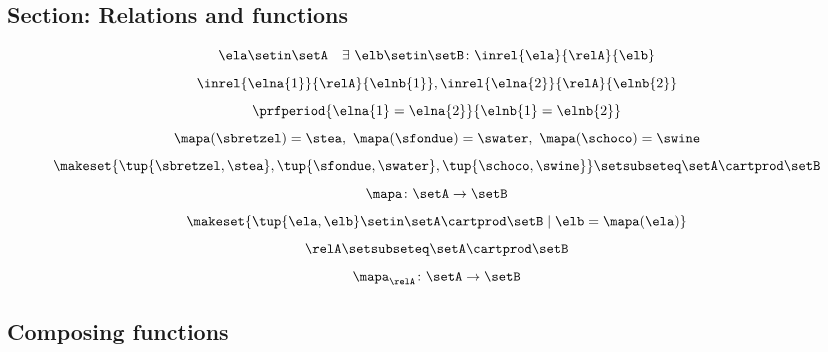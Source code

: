 \begin{forslides}
    \subsection{Section: Relations and functions}

    \begin{equation}
        \label{eq:slides_session2_rel_99}
        \ela \setin \setA \quad \exists \ \elb \setin \setB\colon  \inrel{\ela}{\relA}{\elb}
    \end{equation}
    \begin{equation}
        \label{eq:slides_session2_rel_100}
        \inrel{\elna{1}}{\relA}{\elnb{1}}, \inrel{\elna{2}}{\relA}{\elnb{2}}
    \end{equation}
    \begin{equation}
        \label{eq:slides_session2_rel_101}
        \prfperiod{\elna{1} = \elna{2}}{\elnb{1} = \elnb{2}}
    \end{equation}
    \begin{equation}
        \label{eq:slides_session2_rel_102}
        \mapa (\sbretzel) = \stea, \ \mapa (\sfondue) = \swater, \ \mapa(\schoco) = \swine
    \end{equation}
    \begin{equation}
        \label{eq:slides_session2_rel_103}
        \makeset{ \tup{\sbretzel, \stea}, \tup{\sfondue, \swater}, \tup{\schoco, \swine} } \setsubseteq \setA \cartprod \setB
    \end{equation}
    \begin{equation}
        \label{eq:slides_session2_rel_104}
        \mapa \colon \setA \to \setB
    \end{equation}
    \begin{equation}
        \label{eq:slides_session2_rel_105}
        \makeset{ \tup{\ela,\elb} \setin \setA \cartprod \setB \mid \elb= \mapa(\ela) }
    \end{equation}
    \begin{equation}
        \label{eq:slides_session2_rel_106}
        \relA \setsubseteq \setA \cartprod \setB
    \end{equation}
    \begin{equation}
        \label{eq:slides_session2_rel_107}
        \mapa_\relA \colon \setA \to \setB
    \end{equation}

    \subsection{Composing functions}


\end{forslides}
